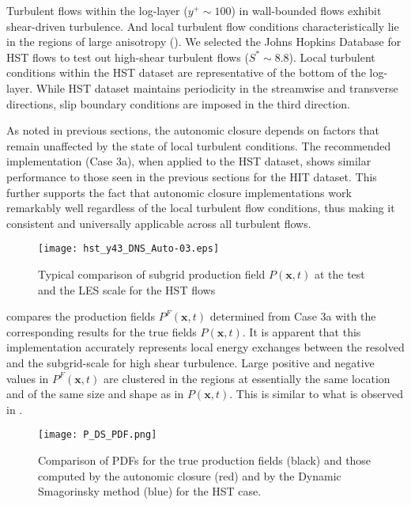 Turbulent flows within the log-layer ($y^+\sim100$) in wall-bounded flows exhibit shear-driven turbulence. And local turbulent flow conditions characteristically lie in the regions of large anisotropy (). We selected the Johns Hopkins Database for HST flows to test out high-shear turbulent flows ($S^*\sim8.8$). Local turbulent conditions within the HST dataset \cite{jhu256} are representative of the bottom of the log-layer. While HST dataset maintains periodicity in the streamwise and transverse directions, slip boundary conditions are imposed in the third direction.

As noted in previous sections, the autonomic closure depends on factors that remain unaffected by the state of local turbulent conditions. The recommended implementation (Case 3a), when applied to the HST dataset, shows similar performance to those seen in the previous sections for the HIT dataset. This further supports the fact that autonomic closure implementations work remarkably well regardless of the local turbulent flow conditions, thus making it consistent and universally applicable across all turbulent flows.


%
\begin{figure}
	\begin{center} \hspace{1.5cm}
	\texttt{[image: hst\_y43\_DNS\_Auto-03.eps]}
	\caption{Typical comparison of subgrid production field $P(\mathbf{x},t)$ at the test and the LES scale for the HST flows }
	\label{F:P_SS}
	\end{center}
\end{figure}
%
%

  compares the production fields $P^F(\mathbf{x},t)$ determined from Case 3a  with the corresponding results for the true fields $P(\mathbf{x},t)$. It is apparent that this implementation accurately represents local energy exchanges between the resolved and the subgrid-scale for high shear turbulence. Large positive and negative values in $P^F(\mathbf{x},t)$ are clustered in the regions at essentially the same location and of the same size and shape as in $P(\mathbf{x},t)$. This is similar to what is observed in . 


%
\begin{figure}
	\begin{center}
	\texttt{[image: P\_DS\_PDF.png]}
	\caption{Comparison of PDFs for the true production fields (black) and those computed by the autonomic closure (red) and by the Dynamic Smagorinsky method (blue) for the HST case.}
	\label{F:PDF_HST}
	\end{center}
\end{figure}
%
%


